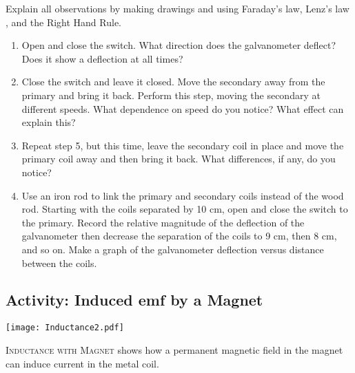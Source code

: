 	Explain all observations by making drawings and using Faraday's law, Lenz's law , and the Right Hand Rule.
\begin{enumerate}[resume]
	 \item Open and close the switch.  What direction does the galvanometer deflect?  Does it show a deflection at all times?  
	\item Close the switch and leave it closed.  Move the secondary away from the primary and bring it back.  Perform this step, moving the secondary at different speeds.  What dependence on speed do you notice?  What effect can explain this?
	\item Repeat step 5, but this time, leave the secondary coil in place and move the primary coil away and then bring it back.  What differences, if any, do you notice?
	\item Use an iron rod to link the primary and secondary coils instead of the wood rod.  Starting with the coils separated by 10 cm, open and close the switch to the primary.  Record the relative magnitude of the deflection of the galvanometer then decrease the separation of the coils to 9 cm, then 8 cm, and so on.  Make a graph of the galvanometer deflection versus distance between the coils. 
\end{enumerate}

\subsection{Activity: Induced emf by a Magnet}

\begin{marginfigure}
	\label{fig:mag-inductance}
	\texttt{[image: Inductance2.pdf]}
	\caption[Magnet Inductance]{\textsc{Inductance with Magnet} shows how a permanent magnetic field in the magnet can induce current in the metal coil.}
\end{marginfigure}

